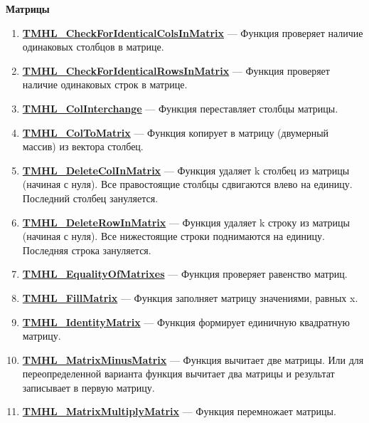 \documentclass[a4paper,12pt]{article}
\begin{document}
\textbf{Матрицы}
\begin{enumerate}

\item \textbf{\hyperref[TMHL_CheckForIdenticalColsInMatrix]{TMHL\_CheckForIdenticalColsInMatrix}} --- Функция проверяет наличие одинаковых столбцов в матрице.

\item \textbf{\hyperref[TMHL_CheckForIdenticalRowsInMatrix]{TMHL\_CheckForIdenticalRowsInMatrix}} --- Функция проверяет наличие одинаковых строк в матрице.

\item \textbf{\hyperref[TMHL_ColInterchange]{TMHL\_ColInterchange}} --- Функция переставляет столбцы матрицы.

\item \textbf{\hyperref[TMHL_ColToMatrix]{TMHL\_ColToMatrix}} --- Функция копирует в матрицу (двумерный массив) из вектора столбец.

\item \textbf{\hyperref[TMHL_DeleteColInMatrix]{TMHL\_DeleteColInMatrix}} --- Функция удаляет k столбец из матрицы (начиная с нуля). Все правостоящие столбцы сдвигаются влево  на единицу. Последний столбец зануляется.

\item \textbf{\hyperref[TMHL_DeleteRowInMatrix]{TMHL\_DeleteRowInMatrix}} --- Функция удаляет k строку из матрицы (начиная с нуля). Все нижестоящие строки поднимаются на единицу. Последняя строка зануляется.

\item \textbf{\hyperref[TMHL_EqualityOfMatrixes]{TMHL\_EqualityOfMatrixes}} --- Функция проверяет равенство матриц.

\item \textbf{\hyperref[TMHL_FillMatrix]{TMHL\_FillMatrix}} --- Функция заполняет матрицу значениями, равных x.

\item \textbf{\hyperref[TMHL_IdentityMatrix]{TMHL\_IdentityMatrix}} --- Функция формирует единичную квадратную матрицу.

\item \textbf{\hyperref[TMHL_MatrixMinusMatrix]{TMHL\_MatrixMinusMatrix}} --- Функция вычитает две матрицы. Или для переопределенной варианта функция вычитает два матрицы и результат записывает в первую матрицу. 

\item \textbf{\hyperref[TMHL_MatrixMultiplyMatrix]{TMHL\_MatrixMultiplyMatrix}} --- Функция перемножает матрицы.


\end{enumerate}
\end{document}
